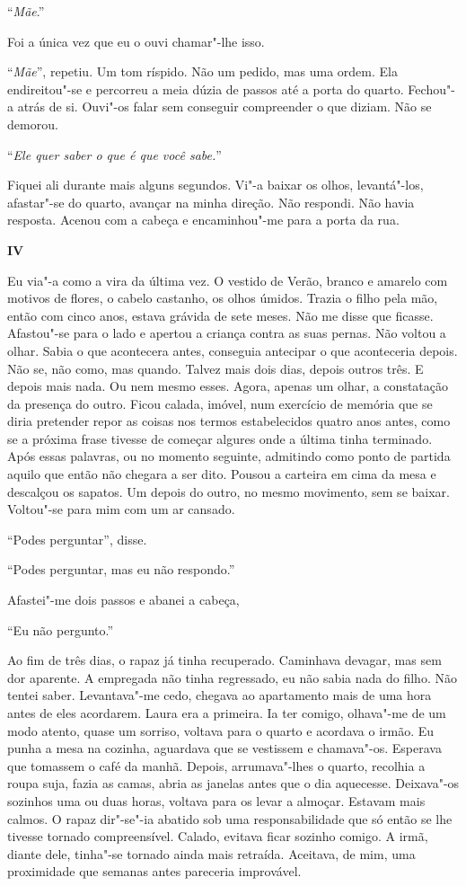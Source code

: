 ``\emph{Mãe}.''

Foi a única vez que eu o ouvi chamar"-lhe isso.

``\emph{Mãe}'',
repetiu. Um tom ríspido. Não um pedido, mas uma ordem. Ela
endireitou"-se e percorreu a meia dúzia de passos até a porta do quarto.
Fechou"-a atrás de si. Ouvi"-os falar sem conseguir compreender o que
diziam. Não se demorou.

``\emph{Ele quer saber o que é que você sabe.}''

Fiquei ali durante mais alguns segundos. Vi"-a baixar os olhos,
levantá"-los, afastar"-se do quarto, avançar na minha direção. Não
respondi. Não havia resposta. Acenou com a cabeça e encaminhou"-me para
a porta da rua.

\vspace*{1.8cm}
\noindent{}\textbf{IV}

\bigskip

Eu via"-a como a vira da última vez. O vestido de Verão, branco e
amarelo com motivos de flores, o cabelo castanho, os olhos úmidos.
Trazia o filho pela mão, então com cinco anos, estava grávida de sete
meses. Não me disse que ficasse. Afastou"-se para o lado e apertou a
criança contra as suas pernas. Não voltou a olhar. Sabia o que
acontecera antes, conseguia antecipar o que aconteceria depois. Não se,
não como, mas quando. Talvez mais dois dias, depois outros três. E
depois mais nada. Ou nem mesmo esses. Agora, apenas um olhar, a
constatação da presença do outro. Ficou calada, imóvel, num exercício de
memória que se diria pretender repor as coisas nos termos estabelecidos
quatro anos antes, como se a próxima frase tivesse de começar algures
onde a última tinha terminado. Após essas palavras, ou no momento
seguinte, admitindo como ponto de partida aquilo que então não chegara a
ser dito. Pousou a carteira em cima da mesa e descalçou os sapatos. Um
depois do outro, no mesmo movimento, sem se baixar. Voltou"-se para mim
com um ar cansado.

``Podes perguntar'',
disse.

``Podes perguntar, mas eu não respondo.''

Afastei"-me dois passos e abanei a cabeça,

``Eu não pergunto.''

Ao fim de três dias, o rapaz já tinha recuperado. Caminhava devagar, mas
sem dor aparente. A empregada não tinha regressado, eu não sabia nada do
filho. Não tentei saber. Levantava"-me cedo, chegava ao apartamento mais
de uma hora antes de eles acordarem. Laura era a primeira. Ia ter
comigo, olhava"-me de um modo atento, quase um sorriso, voltava para o
quarto e acordava o irmão. Eu punha a mesa na cozinha, aguardava que se
vestissem e chamava"-os. Esperava que tomassem o café da manhã.
Depois, arrumava"-lhes o quarto, recolhia a roupa suja, fazia as camas,
abria as janelas antes que o dia aquecesse. Deixava"-os sozinhos uma ou
duas horas, voltava para os levar a almoçar. Estavam mais calmos. O
rapaz dir"-se"-ia abatido sob uma responsabilidade que só então se lhe
tivesse tornado compreensível. Calado, evitava ficar sozinho comigo. A
irmã, diante dele, tinha"-se tornado ainda mais retraída. Aceitava, de
mim, uma proximidade que semanas antes pareceria improvável.

